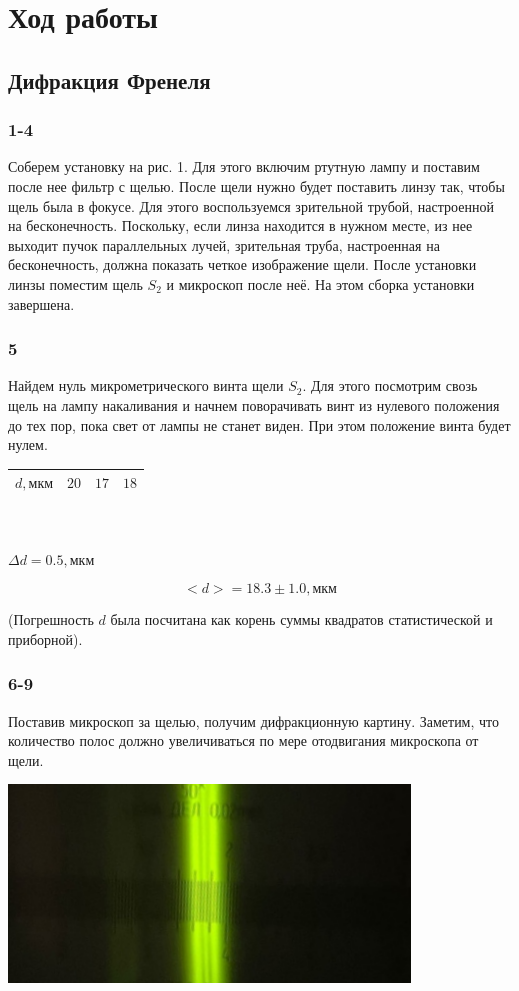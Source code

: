\section*{Ход работы}
\subsection*{Дифракция Френеля}
\subsubsection*{1-4}
Соберем установку на рис. 1. Для этого включим ртутную лампу и поставим после нее фильтр с щелью. После щели нужно будет поставить линзу так, чтобы щель была в фокусе. Для этого воспользуемся зрительной трубой, настроенной на бесконечность. Поскольку, если линза находится в нужном месте, из нее выходит пучок параллельных лучей, зрительная труба, настроенная на бесконечность, должна показать четкое изображение щели. После установки линзы поместим щель $S_2$ и микроскоп после неё. На этом сборка установки завершена.
\subsubsection*{5}
Найдем нуль микрометрического винта щели $S_2$. Для этого посмотрим свозь щель на лампу накаливания и начнем поворачивать винт из нулевого положения до тех пор, пока свет от лампы не станет виден. При этом положение винта будет нулем.

\begin{center}
\begin{tabular}{|c|c|c|c|}
\hline
$d, \text{мкм}$&$20$&$17$&$18$\\ \hline
\end{tabular}\\~\\
$\Delta d = 0.5, \text{мкм}$
\end{center} 
\[<d> = 18.3 \pm 1.0, \text{мкм}\]

(Погрешность $d$ была посчитана как корень суммы квадратов статистической и приборной).

\subsubsection*{6-9}

Поставив микроскоп за щелью, получим дифракционную картину. Заметим, что количество полос должно увеличиваться по мере отодвигания микроскопа от щели.

\begin{center}
\includegraphics[width=0.80\textwidth]{4.png}
\end{center}


